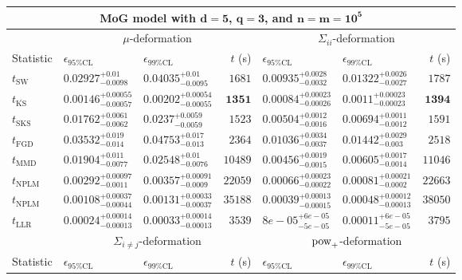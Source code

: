 \begin{tabular}{l|llr|llr}
	\toprule
	\multicolumn{7}{c}{{\bf MoG model with $\mathbf{d=5}$, $\mathbf{q=3}$, and $\mathbf{n=m=10^{5}}$}} \\
	\toprule
	\multicolumn{1}{c}{} & \multicolumn{3}{c}{$\mu$-deformation} & \multicolumn{3}{c}{$\Sigma_{ii}$-deformation} \\
	Statistic & $\epsilon_{95\%\mathrm{CL}}$ & $\epsilon_{99\%\mathrm{CL}}$ & $t$ (s) & $\epsilon_{95\%\mathrm{CL}}$ & $\epsilon_{99\%\mathrm{CL}}$ & $t$ (s) \\
	\midrule
	$t_{\mathrm{SW}}$ & $0.02927_{-0.0098}^{+0.01}$ & $0.04035_{-0.0095}^{+0.01}$ & $1681$ & $0.00935_{-0.0032}^{+0.0028}$ & $0.01322_{-0.0027}^{+0.0026}$ & $1787$ \\
	$t_{\overline{\mathrm{KS}}}$ & ${\mathbf{0.00146_{-0.00057}^{+0.00055}}}$ & ${\mathbf{0.00202_{-0.00055}^{+0.00054}}}$ & ${\mathbf{1351}}$ & ${\mathbf{0.00084_{-0.00026}^{+0.00023}}}$ & ${\mathbf{0.0011_{-0.00023}^{+0.00023}}}$ & ${\mathbf{1394}}$ \\
	$t_{\mathrm{SKS}}$ & $0.01762_{-0.0062}^{+0.0061}$ & $0.0237_{-0.0059}^{+0.0059}$ & $1523$ & $0.00504_{-0.0016}^{+0.0012}$ & $0.00694_{-0.0012}^{+0.0011}$ & $1591$ \\
	$t_{\mathrm{FGD}}$ & $0.03532_{-0.014}^{+0.019}$ & $0.04753_{-0.013}^{+0.017}$ & $2364$ & $0.01036_{-0.0037}^{+0.0034}$ & $0.01442_{-0.003}^{+0.0029}$ & $2518$ \\
	$t_{\mathrm{MMD}}$ & $0.01904_{-0.0077}^{+0.011}$ & $0.02548_{-0.0076}^{+0.01}$ & $10489$ & $0.00456_{-0.0015}^{+0.0019}$ & $0.00605_{-0.0014}^{+0.0017}$ & $11046$ \\
\rowcolor{red!35}	$t_{\mathrm{NPLM}}$ & $0.00292_{-0.0011}^{+0.00097}$ & $0.00357_{-0.0009}^{+0.00091}$ & $22059$ & $0.00066_{-0.00022}^{+0.00023}$ & $0.00081_{-0.0002}^{+0.00021}$ & $22663$ \\
\rowcolor{blue!35}	$t_{\mathrm{NPLM}}$ & $0.00108_{-0.00044}^{+0.00037}$ & $0.00131_{-0.00037}^{+0.00033}$ & $35188$ & $0.00039_{-0.00015}^{+0.00013}$ & $0.00048_{-0.00013}^{+0.00012}$ & $38050$ \\
	$t_{\mathrm{LLR}}$ & $0.00024_{-0.00013}^{+0.00014}$ & $0.00033_{-0.00013}^{+0.00014}$ & $3539$ & $8e-05_{-5e-05}^{+6e-05}$ & $0.00011_{-5e-05}^{+6e-05}$ & $3795$ \\
	\toprule
	\multicolumn{1}{c}{} & \multicolumn{3}{c}{$\Sigma_{i\neq j}$-deformation} & \multicolumn{3}{c}{$\rm{pow}_{+}$-deformation} \\
	Statistic & $\epsilon_{95\%\mathrm{CL}}$ & $\epsilon_{99\%\mathrm{CL}}$ & $t$ (s) & $\epsilon_{95\%\mathrm{CL}}$ & $\epsilon_{99\%\mathrm{CL}}$ & $t$ (s) \\

\end{tabular}
